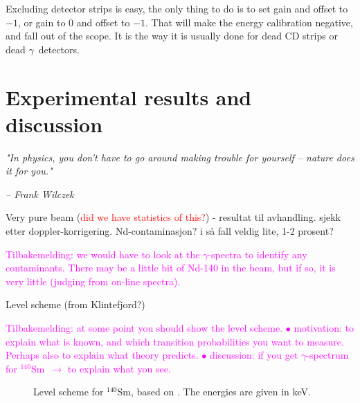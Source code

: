 \documentclass[twoside,english]{uiofysmaster/uiofysmaster}
\newcommand{\Sm}{$^{140}$Sm} %
\newcommand{\ga}{$\gamma$}
\begin{document}
Excluding detector strips is easy, the only thing to do is to set gain and offset to $-1$, or gain to $0$ and offset to $-1$. 
That will make the energy calibration negative, and fall out of the scope. 
It is the way it is usually done for dead CD strips or dead \ga\ detectors. 




\chapter{Experimental results and discussion}
\epigraph{\textit{"In physics, you don't have to go around making trouble for yourself – nature does it for you."}}{\textit{– Frank Wilczek}}


Very pure beam (\textcolor{red}{did we have statistics of this?}) - resultat til avhandling. sjekk etter doppler-korrigering. Nd-contaminasjon? i så fall veldig lite, 1-2 prosent?

\textcolor{Magenta}{Tilbakemelding: \newline
we would have to look at the \ga-spectra to identify any contaminants. There may be a little bit of Nd-140 in the beam, but if so, it is very little (judging from on-line spectra).}


\bigskip


Level scheme (from Klintefjord?)\newline

\textcolor{Magenta}{Tilbakemelding: \newline
at some point you should show the level scheme. \newline
$\bullet$ motivation: to explain what is known, and which transition probabilities you want to measure.  \newline
Perhaps also to explain what theory predicts. \newline
$\bullet$ discussion: if you get \ga-spectrum for \Sm\ $\rightarrow$ to explain what you see.}


\begin{figure}[ht]
	\centering
	
	\caption{Level scheme for \Sm, based on \cite{Klintefjord, NNDC-levels}. The energies are given in keV.}
	\label{fig:levels}
\end{figure}
\end{document}
